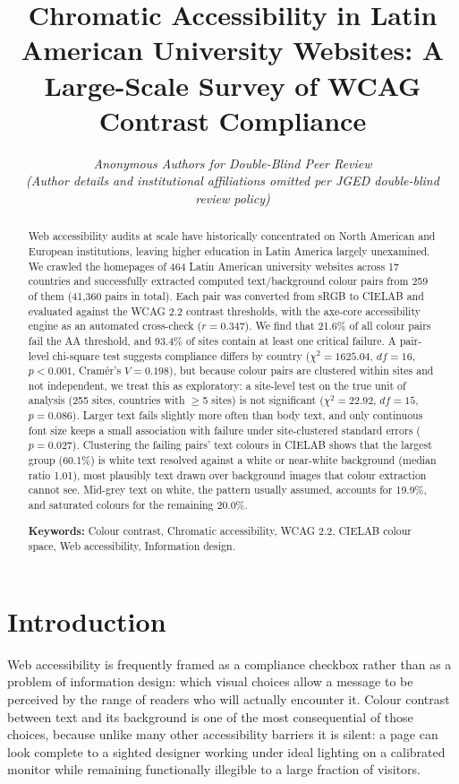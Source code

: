 \documentclass[10pt]{article}
\title{Chromatic Accessibility in Latin American University Websites: A Large-Scale Survey of WCAG Contrast Compliance}
\author{
  \normalsize \textit{Anonymous Authors for Double-Blind Peer Review} \\[0.8ex]
  \small \textit{(Author details and institutional affiliations omitted per JGED double-blind review policy)}
}
\date{}
\begin{document}
\sloppy
\maketitle

\begin{abstract}
Web accessibility audits at scale have historically concentrated on North American and European institutions, leaving higher education in Latin America largely unexamined. We crawled the homepages of 464 Latin American university websites across 17 countries and successfully extracted computed text/background colour pairs from 259 of them (41,360 pairs in total). Each pair was converted from sRGB to CIELAB and evaluated against the WCAG 2.2 contrast thresholds, with the axe-core accessibility engine as an automated cross-check ($r=0.347$). We find that 21.6\% of all colour pairs fail the AA threshold, and 93.4\% of sites contain at least one critical failure. A pair-level chi-square test suggests compliance differs by country ($\chi^2=1625.04$, $df=16$, $p<0.001$, Cram\'{e}r's $V=0.198$), but because colour pairs are clustered within sites and not independent, we treat this as exploratory: a site-level test on the true unit of analysis (255 sites, countries with $\geq$5 sites) is not significant ($\chi^2=22.92$, $df=15$, $p=0.086$). Larger text fails slightly more often than body text, and only continuous font size keeps a small association with failure under site-clustered standard errors ($p=0.027$). Clustering the failing pairs' text colours in CIELAB shows that the largest group (60.1\%) is white text resolved against a white or near-white background (median ratio 1.01), most plausibly text drawn over background images that colour extraction cannot see. Mid-grey text on white, the pattern usually assumed, accounts for 19.9\%, and saturated colours for the remaining 20.0\%.

\vspace{0.8em}
{\sloppy\noindent\textbf{Keywords:} Colour contrast, Chromatic accessibility, WCAG 2.2, CIELAB colour space, Web accessibility, Information design.\par}
\end{abstract}

\section{Introduction}

Web accessibility is frequently framed as a compliance checkbox rather than as a problem of information design: which visual choices allow a message to be perceived by the range of readers who will actually encounter it. Colour contrast between text and its background is one of the most consequential of those choices, because unlike many other accessibility barriers it is silent: a page can look complete to a sighted designer working under ideal lighting on a calibrated monitor while remaining functionally illegible to a large fraction of visitors.
\end{document}
